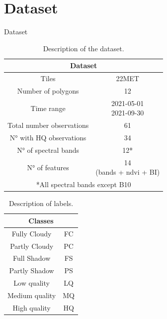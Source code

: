 \documentclass{beamer}
\begin{document}
\section{Dataset}
\begin{frame}{Dataset}
    \begin{minipage}{0.65\textwidth}
        \begin{table}
            \scriptsize
            \begin{tabular}{c|c}
                \hline
                \multicolumn{2}{c}{\textbf{Dataset}} \\
                \hline  	
                Tiles &  22MET \\
                Number of polygons & 12 \\
                Time range & \makecell{2021-05-01 \\ 2021-09-30} \\
                Total number observations & 61\\
                N° with HQ observations & 34 \\
                N° of spectral bands & 12*\\
                N° of features & \makecell{14\\(bands + ndvi + BI)}\\
                \hline
                \multicolumn{2}{c}{*All spectral bands except B10} \\
            \end{tabular}
            \caption{Description of the dataset.}
        \end{table}
    \end{minipage}
    \begin{minipage}{0.3\textwidth}
        \begin{table}
            \scriptsize
            \begin{tabular}{c|c}
            \hline
                \multicolumn{2}{c}{\textbf{Classes}} \\ \hline
                Fully Cloudy & FC \\
                Partly Cloudy& PC \\
                Full Shadow & FS \\
                Partly Shadow& PS \\
                Low quality & LQ \\
                Medium quality & MQ\\
                High quality & HQ \\
                \hline
            \end{tabular}
            \caption{Description of labels.}
        \end{table}
    \end{minipage}
\end{frame}
\end{document}

